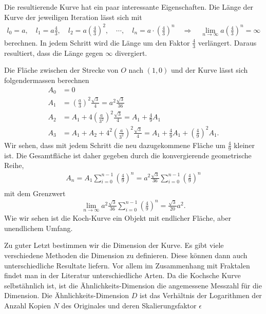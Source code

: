 Die resultierende Kurve hat ein paar interessante Eigenschaften.
Die Länge der Kurve der jeweiligen Iteration lässt sich mit 
\begin{align*}
	l_0 = a ,\quad l_1 = a  \frac{4}{3} ,\quad l_2 = a  \left( \frac{4}{3}\right)^2 , \quad \cdots , \quad
	l_n = a \cdot \left( \frac{4}{3}\right)^n \quad
	\Rightarrow \quad
	\lim_{n\to\infty} a  \left( \frac{4}{3}\right)^n = \infty
\end{align*}
berechnen.
In jedem Schritt wird die Länge um den Faktor $\frac{4}{3}$ verlängert. Daraus resultiert, dass die Länge gegen $\infty$ divergiert. 


Die Fläche zwischen der Strecke von $O$ nach $(1,0)$ und der Kurve lässt sich folgendermassen berechnen
\begin{align*}
	A_0 &= 0 \\
	A_1 &= \left( \frac{a}{3}\right)^2 \frac{\sqrt{3}}{4} = a^2 \frac{\sqrt{3}}{36}\\
	A_2 &= A_1 + 4\left( \frac{a}{3^2}\right)^2 \frac{\sqrt{3}}{4} = A_1 + \frac{4}{9} A_1 \\ 
	A_3 &= A_1 + A_2 + 4^2 \left( \frac{a}{3^2}\right)^2 \frac{\sqrt{3}}{4} = A_1 + \frac{4}{9} A_1 + \left( \frac{4}{9}\right)^2 A_1.
\end{align*}
Wir sehen, dass mit jedem Schritt die neu dazugekommene Fläche um $\frac{4}{9}$ kleiner ist.
Die Gesamtfläche ist daher gegeben durch die konvergierende geometrische Reihe,
\begin{align*}
	A_n = A_1 \sum_{i = 0}^{n-1} \left( \frac{4}{9}\right)^n =  a^2 \frac{\sqrt{3}}{36} \sum_{i = 0}^{n-1} \left( \frac{4}{9}\right)^n \\
\end{align*}
mit dem Grenzwert
\begin{align*}
	\lim_{n\to\infty} a^2 \frac{\sqrt{3}}{36} \sum_{i = 0}^{n-1} \left( \frac{4}{9}\right)^n = \frac{\sqrt{3}}{20} a^2. 
\end{align*}
Wie wir sehen ist die Koch-Kurve ein Objekt mit endlicher Fläche, aber unendlichem Umfang.


Zu guter Letzt bestimmen wir die Dimension der Kurve. 
Es gibt viele verschiedene Methoden die Dimension zu definieren. Diese können dann auch unterschiedliche Resultate liefern.
Vor allem im Zusammenhang mit Fraktalen findet man in der Literatur unterschiedliche Arten.
Da die Kochsche Kurve selbstähnlich ist, ist die Ähnlichkeits-Dimension \cite{ifs:fractal-geometry} die angemessene Messzahl für die Dimension.
Die Ähnlichkeits-Dimension $D$ ist das Verhältnis der Logarithmen der Anzahl Kopien $N$ des Originales und deren Skalierungsfaktor $\epsilon$
  
